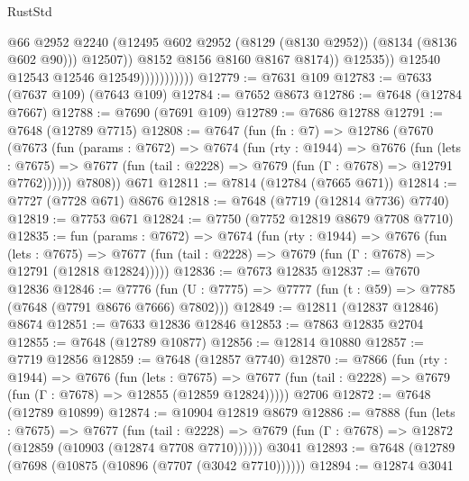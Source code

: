 \begin{lexlean}{RustStd}
\begin{coremodule}
{\begin{coremodule}
{{{{{{{{{{{{{{{{{{{{{{{{{{{{{{{{{{{{{{{{{{{{{{{{{{{{{                                      @66
                                      @2952
                                      @2240
                                      (@12495
                                        @602
                                        @2952
                                        (@8129 (@8130 @2952))
                                        (@8134 (@8136 @602 @90)))
                                      @12507))
                                  @8152
                                  @8156
                                  @8160
                                  @8167
                                  @8174))
                              @12535))
                          @12540
                          @12543
                          @12546
                          @12549)))))))))))
@12779 := @7631 @109
@12783 := @7633 (@7637 @109) (@7643 @109)
@12784 := @7652 @8673
@12786 := @7648 (@12784 @7667)
@12788 := @7690 (@7691 @109)
@12789 := @7686 @12788
@12791 := @7648 (@12789 @7715)
@12808 := @7647
    (fun (fn : @7) =>
    @12786
      (@7670
        (@7673
          (fun (params : @7672) =>
          @7674
            (fun (rty : @1944) =>
            @7676
              (fun (lets : @7675) =>
              @7677 (fun (tail : @2228) => @7679 (fun (Γ : @7678) => @12791 @7762))))))
        @7808))
    @671
@12811 := @7814 (@12784 (@7665 @671))
@12814 := @7727 (@7728 @671) @8676
@12818 := @7648 (@7719 (@12814 @7736) @7740)
@12819 := @7753 @671
@12824 := @7750 (@7752 @12819 @8679 @7708 @7710)
@12835 := fun (params : @7672) =>
  @7674
    (fun (rty : @1944) =>
    @7676
      (fun (lets : @7675) =>
      @7677 (fun (tail : @2228) => @7679 (fun (Γ : @7678) => @12791 (@12818 @12824)))))
@12836 := @7673 @12835
@12837 := @7670 @12836
@12846 := @7776
    (fun (U : @7775) => @7777 (fun (t : @59) => @7785 (@7648 (@7791 @8676 @7666) @7802)))
@12849 := @12811 (@12837 @12846) @8674
@12851 := @7633 @12836 @12846
@12853 := @7863 @12835 @2704
@12855 := @7648 (@12789 @10877)
@12856 := @12814 @10880
@12857 := @7719 @12856
@12859 := @7648 (@12857 @7740)
@12870 := @7866
    (fun (rty : @1944) =>
    @7676
      (fun (lets : @7675) =>
      @7677 (fun (tail : @2228) => @7679 (fun (Γ : @7678) => @12855 (@12859 @12824)))))
    @2706
@12872 := @7648 (@12789 @10899)
@12874 := @10904 @12819 @8679
@12886 := @7888
    (fun (lets : @7675) =>
    @7677
      (fun (tail : @2228) =>
      @7679 (fun (Γ : @7678) => @12872 (@12859 (@10903 (@12874 @7708 @7710))))))
    @3041
@12893 := @7648 (@12789 (@7698 (@10875 (@10896 (@7707 (@3042 @7710))))))
@12894 := @12874 @3041
}}}}}}}}}}}}}}}}}}}}}}}}}}}}}}}}}}}}}}}}}}}}}}}}}}}}}
\end{coremodule}}
\end{coremodule}
\end{lexlean}
